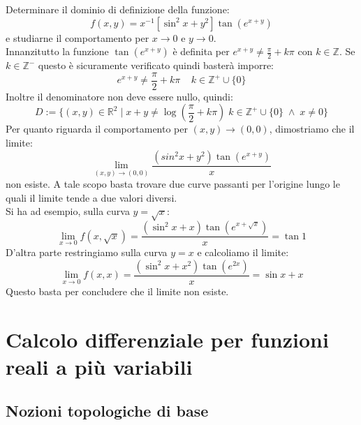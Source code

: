 \documentclass[a4paper]{article}
\numberwithin{equation}{subsection}
\begin{document}
{
    Determinare il dominio di definizione della funzione:
    \[f(x,y) = x^{-1}[\sin^2{x} + y^2]\tan{(e^{x+y})}\]
    e studiarne il comportamento per $x \rightarrow 0$ e $y \rightarrow 0$.\\
    Innanzitutto la funzione $\tan{(e^{x+y})}$ è definita per $e^{x+y} \neq \frac{\pi}{2} + k\pi$ con $k \in \mathbb{Z}$. Se $k \in \mathbb{Z}^-$ questo è sicuramente verificato quindi basterà imporre:
    \[e^{x+y} \neq \frac{\pi}{2} + k\pi \; \; \; \; k \in \mathbb{Z}^+ \cup \{0\}\] 
    Inoltre il denominatore non deve essere nullo, quindi:
    \[D := \{(x,y) \in \mathbb{R}^2\; | \; x + y \neq \log{\left(\frac{\pi}{2} + k\pi\right)} \; k \in \mathbb{Z}^+ \cup \{0\} \; \wedge \; x \neq 0\}\]
    Per quanto riguarda il comportamento per $(x,y) \rightarrow (0,0)$, dimostriamo che il limite:
    \[\lim_{(x,y) \rightarrow (0,0)} \frac{(sin^2{x} + y^2)\tan{(e^{x+y})}}{x}\]
    non esiste. A tale scopo basta trovare due curve passanti per l'origine lungo le quali il limite tende a due valori diversi.\\
    Si ha ad esempio, sulla curva $y = \sqrt{x}$:
    \[\lim_{x \rightarrow 0} f(x, \sqrt{x}) = \frac{(\sin^2{x} + x)\tan{(e^{x+\sqrt{x}})}}{x} = \tan{1} \]
    D'altra parte restringiamo sulla curva $y = x$ e calcoliamo il limite:
    \[\lim_{x \rightarrow 0} f(x,x) = \frac{(\sin^2{x} + x^2)\tan{(e^{2x})}}{x} = \sin{x} + x\]
    Questo basta per concludere che il limite non esiste.
}

\section{Calcolo differenziale per funzioni reali a più variabili}

\subsection{Nozioni topologiche di base}
\end{document}
